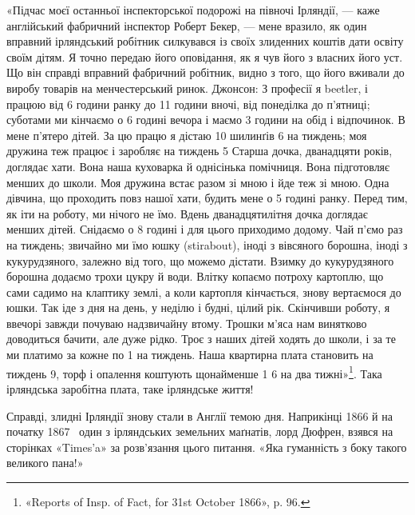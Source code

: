 «Підчас моєї останньої інспекторської подорожі на півночі
Ірляндії, — каже англійський фабричний інспектор Роберт Бекер,
— мене вразило, як один вправний ірляндський робітник
силкувався із своїх злиденних коштів дати освіту своїм дітям.
Я точно передаю його оповідання, як я чув його з власних його
уст. Що він справді вправний фабричний робітник, видно з того,
що його вживали до виробу товарів на менчестерський ринок.
Джонсон: З професії я beetler, і працюю від 6 години ранку до
11 години вночі, від понеділка до п’ятниці; суботами ми кінчаємо
о 6 годині вечора і маємо 3 години на обід і відпочинок. В мене
п’ятеро дітей. За цю працю я дістаю 10 шилинґів 6 на тиждень;
моя дружина теж працює і заробляє на тиждень 5
Старша дочка, дванадцяти років, доглядає хати. Вона наша
куховарка й однісінька помічниця. Вона підготовляє менших
до школи. Моя дружина встає разом зі мною і йде теж зі мною.
Одна дівчина, що проходить повз нашої хати, будить мене о 5
годині ранку. Перед тим, як іти на роботу, ми нічого не їмо.
Вдень дванадцятилітня дочка доглядає менших дітей. Снідаємо
о 8 годині і для цього приходимо додому. Чай п’ємо раз на тиждень;
звичайно ми їмо юшку (stirabout), іноді з вівсяного борошна,
іноді з кукурудзяного, залежно від того, що можемо дістати.
Взимку до кукурудзяного борошна додаємо трохи цукру й води.
Влітку копаємо потроху картоплю, що сами садимо на клаптику
землі, а коли картопля кінчається, знову вертаємося до юшки.
Так іде з дня на день, у неділю і будні, цілий рік. Скінчивши
роботу, я ввечорі завжди почуваю надзвичайну втому. Трошки
м’яса нам винятково доводиться бачити, але дуже рідко. Троє
з наших дітей ходять до школи, і за те ми платимо за кожне по
1 на тиждень. Наша квартирна плата становить на тиждень
9, торф і опалення коштують щонайменше 1 6
на два тижні»\footnote{
«Reports of Insp. of Fact, for 31st October 1866», p. 96.
}. Така ірляндська заробітна плата, таке
ірляндське життя!

Справді, злидні Ірляндії знову стали в Англії темою дня.
Наприкінці 1866 й на початку 1867~ один з ірляндських земельних
маґнатів, лорд Дюфрен, взявся на сторінках «Times’a» за
розв’язання цього питання. «Яка гуманність з боку такого великого
пана!»

